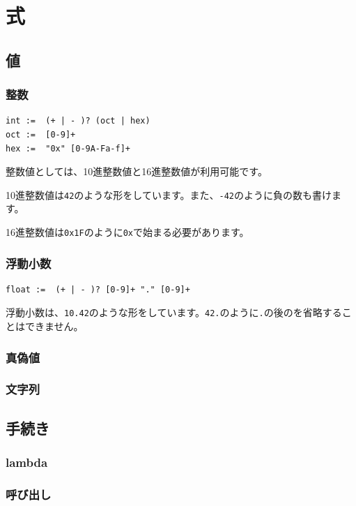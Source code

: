 \documentclass{article}
\begin{document}
\section{式}
\subsection{値}
\subsubsection{整数}

\begin{verbatim}
int :=  (+ | - )? (oct | hex)
oct :=  [0-9]+
hex :=  "0x" [0-9A-Fa-f]+
\end{verbatim}

整数値としては、10進整数値と16進整数値が利用可能です。

10進整数値は\verb!42!のような形をしています。また、\verb!-42!のように負の数も書けます。

16進整数値は\verb!0x1F!のように\verb!0x!で始まる必要があります。

\subsubsection{浮動小数}
\begin{verbatim}
float :=  (+ | - )? [0-9]+ "." [0-9]+
\end{verbatim}

浮動小数は、\verb!10.42!のような形をしています。\verb!42.!のように\verb!.!の後のを省略することはできません。

\subsubsection{真偽値}




\subsubsection{文字列}

\subsection{手続き}
\subsubsection{lambda}
\subsubsection{呼び出し}
\end{document}
